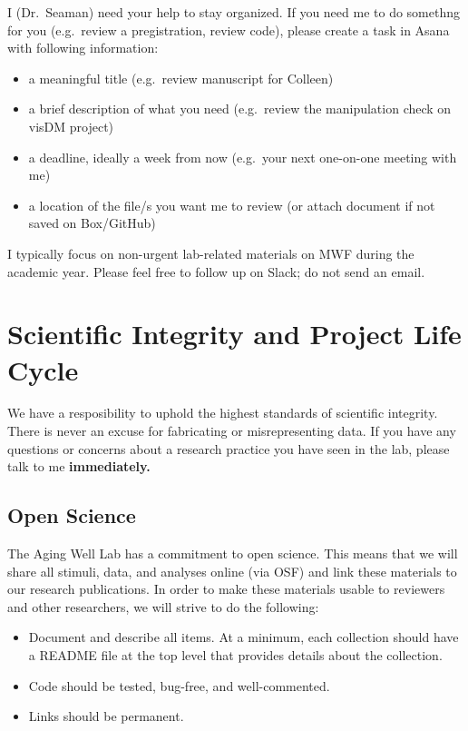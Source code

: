 \documentclass[
]{book}
\providecommand{\tightlist}{%
  \setlength{\itemsep}{0pt}\setlength{\parskip}{0pt}}
\begin{document}
I (Dr.~Seaman) need your help to stay organized. If you need me to do somethng for you (e.g.~review a pregistration, review code), please create a task in Asana with following information:

\begin{itemize}
\item
  a meaningful title (e.g.~review manuscript for Colleen)
\item
  a brief description of what you need (e.g.~review the manipulation check on visDM project)
\item
  a deadline, ideally a week from now (e.g.~your next one-on-one meeting with me)
\item
  a location of the file/s you want me to review (or attach document if not saved on Box/GitHub)
\end{itemize}

I typically focus on non-urgent lab-related materials on MWF during the academic year. Please feel free to follow up on Slack; do not send an email.

\hypertarget{scientific-integrity-and-project-life-cycle}{%
\chapter{Scientific Integrity and Project Life Cycle}\label{scientific-integrity-and-project-life-cycle}}

We have a resposibility to uphold the highest standards of scientific integrity. There is never an excuse for fabricating or misrepresenting data. If you have any questions or concerns about a research practice you have seen in the lab, please talk to me \textbf{immediately.}

\hypertarget{open-science}{%
\section{Open Science}\label{open-science}}

The Aging Well Lab has a commitment to open science. This means that we will share all stimuli, data, and analyses online (via OSF) and link these materials to our research publications. In order to make these materials usable to reviewers and other researchers, we will strive to do the following:

\begin{itemize}
\tightlist
\item
  Document and describe all items. At a minimum, each collection should have a README file at the top level that provides details about the collection.\\
\item
  Code should be tested, bug-free, and well-commented.\\
\item
  Links should be permanent.
\end{itemize}
\end{document}
